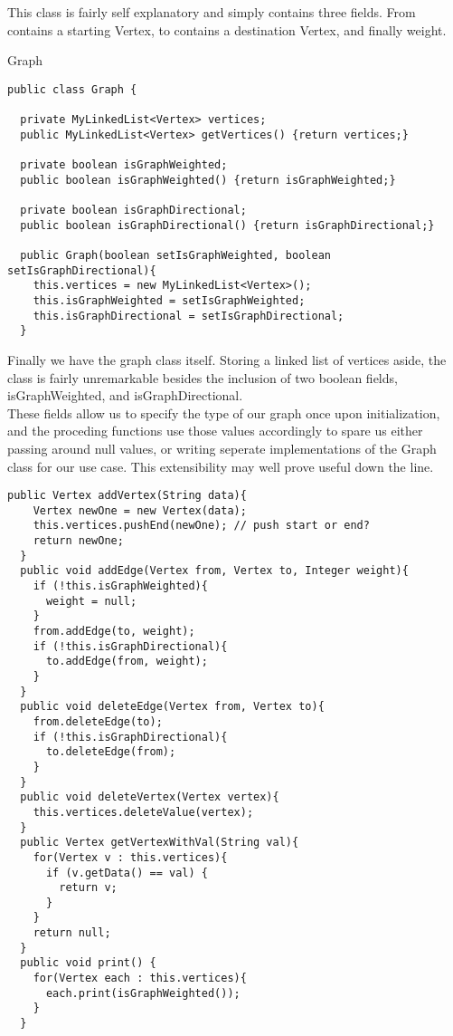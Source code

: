 \documentclass[a4paper]{article}
\begin{document}
This class is fairly self explanatory and simply contains three fields.
From contains a starting Vertex, to contains a destination Vertex,
and finally weight. 
\newpage

\begin{algorithm}
\caption{Graph}\label{euclid}

\begin{verbatim}
public class Graph {
  
  private MyLinkedList<Vertex> vertices;
  public MyLinkedList<Vertex> getVertices() {return vertices;}

  private boolean isGraphWeighted;
  public boolean isGraphWeighted() {return isGraphWeighted;}

  private boolean isGraphDirectional;
  public boolean isGraphDirectional() {return isGraphDirectional;}

  public Graph(boolean setIsGraphWeighted, boolean setIsGraphDirectional){
    this.vertices = new MyLinkedList<Vertex>();
    this.isGraphWeighted = setIsGraphWeighted;
    this.isGraphDirectional = setIsGraphDirectional;
  }
\end{verbatim}
\end{algorithm}

\vspace{8mm}

Finally we have the graph class itself. Storing a linked list of vertices aside,
the class is fairly unremarkable besides
the inclusion of two boolean fields, isGraphWeighted, and isGraphDirectional. \\

These fields allow us to specify the type of our graph once upon initialization,
and the proceding functions use those values accordingly to spare us either passing around null values,
or writing seperate implementations of the Graph class for our use case. This extensibility may well
prove useful down the line.



\newpage
\begin{verbatim}
public Vertex addVertex(String data){
    Vertex newOne = new Vertex(data);
    this.vertices.pushEnd(newOne); // push start or end?
    return newOne;
  }
  public void addEdge(Vertex from, Vertex to, Integer weight){
    if (!this.isGraphWeighted){
      weight = null;
    }
    from.addEdge(to, weight);
    if (!this.isGraphDirectional){
      to.addEdge(from, weight);
    }
  }
  public void deleteEdge(Vertex from, Vertex to){
    from.deleteEdge(to);
    if (!this.isGraphDirectional){
      to.deleteEdge(from);
    }
  }
  public void deleteVertex(Vertex vertex){
    this.vertices.deleteValue(vertex);
  }
  public Vertex getVertexWithVal(String val){
    for(Vertex v : this.vertices){
      if (v.getData() == val) {
        return v;
      }
    }
    return null;
  }
  public void print() {
    for(Vertex each : this.vertices){
      each.print(isGraphWeighted());
    }
  }

\end{verbatim}
\end{document}
